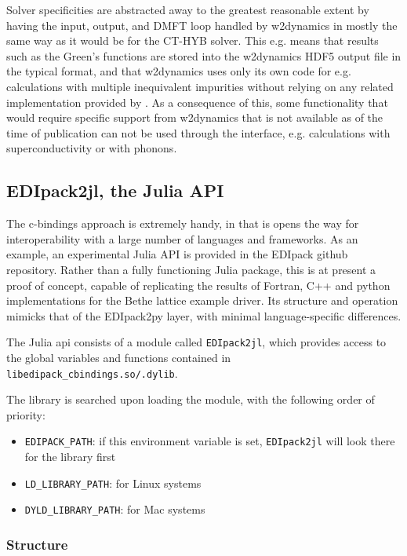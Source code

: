 \documentclass[edipack2.tex]{subfiles}
\begin{document}
Solver specificities are abstracted away to the greatest reasonable extent by having the input, output, and DMFT loop handled by w2dynamics in mostly the same way as it would be for the CT-HYB solver. This e.g. means that results such as the Green's functions are stored into the w2dynamics HDF5 output file in the typical format, and that w2dynamics uses only its own code for e.g. calculations with multiple inequivalent impurities without relying on any related implementation provided by \NAME{}. As a consequence of this, some functionality that would require specific support from w2dynamics that is not available as of the time of publication can not be used through the interface, e.g. calculations with superconductivity or with phonons.



\subsection{EDIpack2jl, the Julia API}\label{sSecInteropEDIjl}

The c-bindings approach is extremely handy, in that is opens the way for interoperability 
with a large number of languages and frameworks. As an example, an experimental Julia API 
is provided in the EDIpack github repository. Rather than a fully functioning Julia package, 
this is at present a proof of concept, capable of replicating the results of Fortran, C++ and
python implementations for the Bethe lattice example driver.
Its structure and operation mimicks that of the EDIpack2py layer, with minimal language-specific differences.

The \NAME{} Julia api consists of a module called {\tt EDIpack2jl}, which provides access to the global variables and functions contained in {\tt  libedipack\_cbindings.so/.dylib}. 

The library is searched upon loading the module, with the following order of priority:

\begin{itemize}
\item {\tt EDIPACK\_PATH}: if this environment variable is set, {\tt EDIpack2jl} will look there for the library first
\item {\tt LD\_LIBRARY\_PATH}: for Linux systems
\item {\tt DYLD\_LIBRARY\_PATH}: for Mac systems
\end{itemize}

\subsubsection{Structure}
\end{document}
